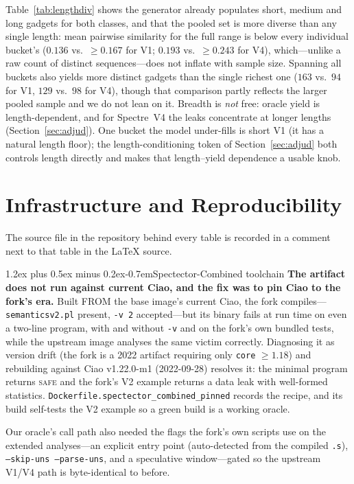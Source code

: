 \documentclass[conference]{IEEEtran}
\makeatletter
\renewcommand\paragraph{\@startsection{paragraph}{4}{\z@}%
  {1.2ex plus 0.5ex minus 0.2ex}{-0.7em}{\normalfont\normalsize\bfseries}}
\makeatother
\begin{document}
Table~\ref{tab:lengthdiv} shows the generator already populates short, medium
and long gadgets for both classes, and that the pooled set is more diverse than
any single length: mean pairwise similarity for the full range is below every
individual bucket's ($0.136$ vs.\ $\ge 0.167$ for V1; $0.193$ vs.\ $\ge 0.243$
for V4), which---unlike a raw count of distinct sequences---does not inflate
with sample size. Spanning all buckets also yields more distinct gadgets than
the single richest one ($163$ vs.\ $94$ for V1, $129$ vs.\ $98$ for V4), though
that comparison partly reflects the larger pooled sample and we do not lean on
it. Breadth is \emph{not} free: oracle yield is length-dependent, and for
Spectre~V4 the leaks concentrate at longer lengths
(Section~\ref{sec:adjud}). One bucket the model under-fills is short V1 (it has
a natural length floor); the length-conditioning token of
Section~\ref{sec:adjud} both controls length directly and makes that
length--yield dependence a usable knob.

\section{Infrastructure and Reproducibility}
\label{app:infra}
The source file in the repository behind every table is recorded in a comment
next to that table in the \LaTeX{} source.

\paragraph{Spectector-Combined toolchain}
\textbf{The artifact does not run against current Ciao, and the fix was to pin
Ciao to the fork's era.} Built FROM the base image's current Ciao, the fork
compiles---\texttt{semanticsv2.pl} present, \texttt{-v 2} accepted---but its
binary fails at run time on even a two-line program, with and without
\texttt{-v} and on the fork's own bundled tests, while the upstream image
analyses the same victim correctly. Diagnosing it as version drift (the fork is
a 2022 artifact requiring only \texttt{core} $\geq 1.18$) and rebuilding
against Ciao v1.22.0-m1 (2022-09-28) resolves it: the minimal program returns
\textsc{safe} and the fork's V2 example returns a data leak with well-formed
statistics. \texttt{Dockerfile.spectector\_combined\_pinned} records the recipe,
and its build self-tests the V2 example so a green build is a working oracle.

Our oracle's call path also needed the flags the fork's own scripts use on the
extended analyses---an explicit entry point (auto-detected from the compiled
\texttt{.s}), \texttt{--skip-uns --parse-uns}, and a speculative window---gated
so the upstream V1/V4 path is byte-identical to before.
\end{document}
